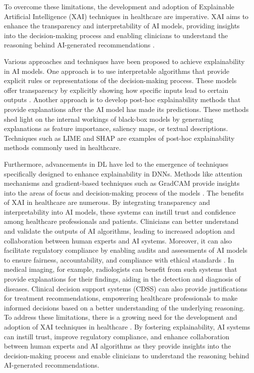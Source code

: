 \documentclass{article}
\begin{document}
To overcome these limitations, the development and adoption of Explainable Artificial Intelligence (XAI)  techniques in healthcare are imperative. XAI aims to enhance the transparency and interpretability of AI models, providing insights into the decision-making process and enabling clinicians to understand the reasoning behind AI-generated recommendations \cite{adadi2020explainable}.

Various approaches and techniques have been proposed to achieve explainability in AI models. One approach is to use interpretable algorithms that provide explicit rules or representations of the decision-making process. These models offer transparency by explicitly showing how specific inputs lead to certain outputs \cite{lin2021you}. Another approach is to develop post-hoc explainability methods that provide explanations after the AI model has made its predictions. These methods shed light on the internal workings of black-box models by generating explanations as feature importance, saliency maps, or textual descriptions. Techniques such as LIME \cite{ribeiro2016should} and SHAP \cite{lundberg2017unified} are examples of post-hoc explainability methods commonly used in healthcare.

Furthermore, advancements in DL have led to the emergence of techniques specifically designed to enhance explainability in DNNs. Methods like attention mechanisms and gradient-based techniques such as GradCAM \cite{selvaraju2017grad} provide insights into the areas of focus and decision-making process of the models \cite{arrieta2020explainable}. The benefits of XAI in healthcare are numerous. By integrating transparency and interpretability into AI models, these systems can instill trust and confidence among healthcare professionals and patients. Clinicians can better understand and validate the outputs of AI algorithms, leading to increased adoption and collaboration between human experts and AI systems. Moreover, it can also facilitate regulatory compliance by enabling audits and assessments of AI models to ensure fairness, accountability, and compliance with ethical standards \cite{amugongo2023operationalising, markus2021role}. In medical imaging, for example, radiologists can benefit from such systems that provide explanations for their findings, aiding in the detection and diagnosis of diseases. Clinical decision support systems (CDSS) can also provide justifications for treatment recommendations, empowering healthcare professionals to make informed decisions based on a better understanding of the underlying reasoning. To address these limitations, there is a growing need for the development and adoption of XAI techniques in healthcare \cite{loh2022application}. By fostering explainability, AI systems can instill trust, improve regulatory compliance, and enhance collaboration between human experts and AI algorithms as they provide insights into the decision-making process and enable clinicians to understand the reasoning behind AI-generated recommendations.
\end{document}
